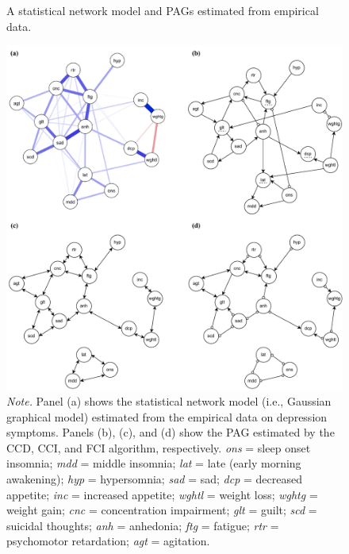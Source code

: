 \documentclass[twoside, 11pt]{article}
\begin{document}
\begin{figure}[!htbp]
    \centering
        \caption{A statistical network model and PAGs estimated from empirical data.}
        \vspace{1mm}
        \includegraphics[width=1\textwidth]{figures/Fig19.pdf}
        \vspace*{1mm}
        \caption*{\small{\textit{Note.} Panel (a) shows the statistical network model (i.e., Gaussian graphical model) estimated from the empirical data on depression symptoms. Panels (b), (c), and (d) show the PAG estimated by the CCD, CCI, and FCI algorithm, respectively. \textit{ons} = sleep onset insomnia; \textit{mdd} = middle insomnia; \textit{lat} = late (early morning awakening); \textit{hyp} = hypersomnia; \textit{sad} = sad; \textit{dcp} = decreased appetite; \textit{inc} = increased appetite; \textit{wghtl} = weight loss; \textit{wghtg} = weight gain; \textit{cnc} = concentration impairment; \textit{glt} = guilt; \textit{scd} = suicidal thoughts; \textit{anh} = anhedonia; \textit{ftg} = fatigue; \textit{rtr} = psychomotor retardation; \textit{agt} = agitation.}}
    \label{fig:20}
\end{figure}
\end{document}
